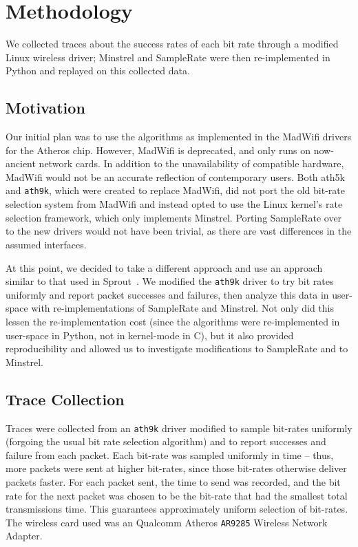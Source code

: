 \documentclass[twocolumn,10pt]{article}
\begin{document}
\section{Methodology}

We collected traces about the success rates of each bit rate through a
modified Linux wireless driver; Minstrel and SampleRate were then
re-implemented in Python and replayed on this collected data.

\subsection{Motivation}

Our initial plan was to use the algorithms as implemented in the
MadWifi drivers for the Atheros chip.  However, MadWifi is deprecated,
and only runs on now-ancient network cards.  In addition to the
unavailability of compatible hardware, MadWifi would not be an
accurate reflection of contemporary users.  Both ath5k and
\texttt{ath9k}, which were created to replace MadWifi, did not port
the old bit-rate selection system from MadWifi and instead opted to
use the Linux kernel's rate selection framework, which only implements
Minstrel.  Porting SampleRate over to the new drivers would not have
been trivial, as there are vast differences in the assumed interfaces.

At this point, we decided to take a different approach and use an
approach similar to that used in Sprout~\cite{sprout}.  We modified
the \texttt{ath9k} driver to try bit rates uniformly and report packet
successes and failures, then analyze this data in user-space with
re-implementations of SampleRate and Minstrel.  Not only did this
lessen the re-implementation cost (since the algorithms were
re-implemented in user-space in Python, not in kernel-mode in C), but
it also provided reproducibility and allowed us to investigate
modifications to SampleRate and to Minstrel.

\subsection{Trace Collection}

Traces were collected from an \texttt{ath9k} driver modified to sample
bit-rates uniformly (forgoing the usual bit rate selection algorithm)
and to report successes and failure from each packet.  Each bit-rate
was sampled uniformly in time -- thus, more packets were sent at
higher bit-rates, since those bit-rates otherwise deliver packets
faster.  For each packet sent, the time to send was recorded, and the
bit rate for the next packet was chosen to be the bit-rate that had
the smallest total transmissions time.  This guarantees approximately
uniform selection of bit-rates.  The wireless card used was an
Qualcomm Atheros \texttt{AR9285} Wireless Network Adapter.
\end{document}
